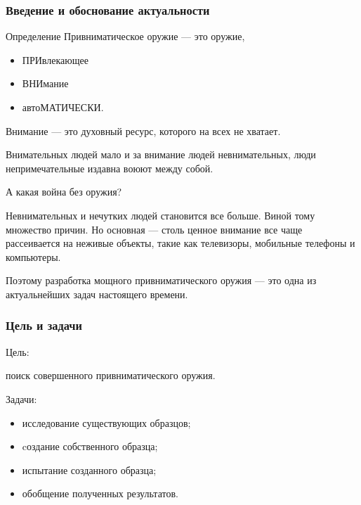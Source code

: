 \begin{frame}
    \frametitle{Введение и обоснование актуальности}
    
    \begin{block}{Определение}
        \alert{Привниматическое} оружие --- это оружие, 
        \begin{itemize}
            \item \alert{ПРИ}влекающее 
            \item \alert{ВНИ}мание 
            \item авто\alert{МАТИЧЕСКИ}.
        \end{itemize}
    \end{block}
    
    
    \alert{Внимание} --- это духовный ресурс, которого на всех не хватает. 

    \par\bigskip

    Внимательных людей мало и за внимание людей невнимательных, люди непримечательные издавна воюют между собой. 

    \par\bigskip

    А какая война без оружия?
\end{frame}
    
Невнимательных и нечутких людей становится все больше. Виной тому множество причин. Но основная --- столь ценное внимание все чаще рассеивается на неживые объекты, такие как телевизоры, мобильные телефоны и компьютеры.
    
Поэтому разработка мощного привниматического оружия --- это одна из актуальнейших задач настоящего времени.

\begin{frame}
    \frametitle{Цель и задачи}
    
    \begin{block}{Цель:}
        \begin{center}
            поиск \alert{совершенного} привниматического оружия.
        \end{center}
    \end{block}
    
    \par\bigskip
    
    \begin{block}{Задачи:}
        \begin{itemize}
            \item исследование существующих образцов; 
            \item cоздание собственного образца;
            \item испытание созданного образца;
            \item обобщение полученных результатов.
        \end{itemize}
    \end{block}
\end{frame}


